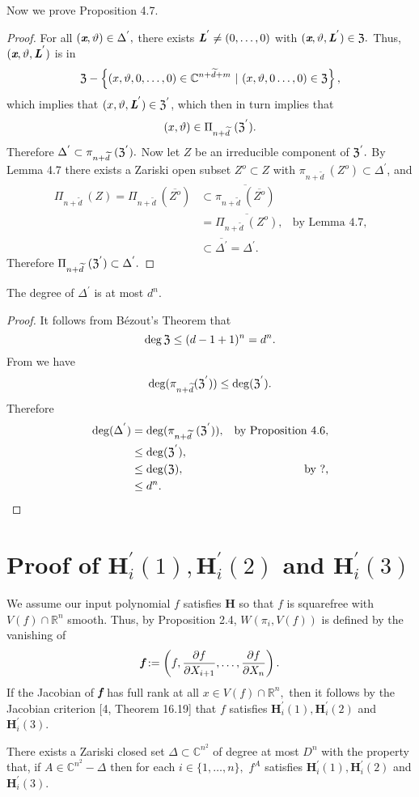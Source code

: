 \documentclass[sigconf]{acmart}
\def\fb{\textit{\textbf{f}}}
\def\C{\mathbb{C}}
\def\vt{\vartheta}
\def\dt{\widetilde{d}}
\def\pa{\partial}
\def\D{\Delta}
\def\Z{\frak{Z}}
\begin{document}
%
%
Now we prove Proposition 4.7.
\begin{proof}
For all $(\textit{\textbf{x}},\vt) \in \D^{'}, $ there exists $\textit{\textbf{L}}^{'} \not = (0,\hdots,0)$ with $(\textit{\textbf{x}},\vt,\textit{\textbf{L}}^{'}) \in \Z.$ Thus, $(\textit{\textbf{x}},\vt,\textit{\textbf{L}}^{'})$ is in
\[
     \Z - \left\{(x,\vt,0,\hdots,0) \in \C^{n+\dt+m}~|~(x,\vt,0\hdots,0) \in \Z\right\}, 
\]
which implies that $(x,\vt,\textit{\textbf{L}}^{'}) \in \Z^{'}$, which then in turn implies that
\[
    (x,\vt) \in \Pi_{n + \dt}~(\Z^{'}).
\]
Therefore $\D^{'} \subset \pi_{n+\dt}~(\Z^{'}).$
\newline \indent 
Now let $Z$ be an irreducible component of $\Z^{'}.$ By Lemma 4.7 there exists a Zariski open subset $Z^o \subset Z$ with $\pi_{n+\dt}~(Z^{o}) \subset \D^{'}$, and
\begin{align*}
 \Pi_{n+\dt}~(Z) = 
  \Pi_{n+\dt}~(\overline{Z^o})
  &\subset 
  \overline{\pi_{n+\dt}~(\overline{Z^o})}\\
  &=
  \overline{\Pi_{n+\dt}~(Z^o)}, &\textrm{by Lemma 4.7,}\\
  &\subset \overline{\D^{'}}=\D^{'}.
\end{align*}
   Therefore $\Pi_{n+\dt}~(\Z^{'}) \subset \D^{'}.$
\end{proof}
%
%
\begin{proposition} 
The degree of $\D^{'}$ is at most $d^n.$
\end{proposition} 
\begin{proof}
It follows from B\'ezout's Theorem that 
\[
\deg \frak{Z} \leq (d-1+1)^n=d^n.
\]
From \cite[Lemma 2]{H} we have 
\[
\deg(\pi_{n+\dt}(\Z^{'})) \leq \deg(\Z^{'}).
\]
Therefore 
\begin{align*}
\deg(\D^{'}) &= \deg(\pi_{n+\dt}~(\Z^{'})),&\textrm{by Proposition 4.6,}\\ 
            &\leq \deg(\Z^{'}),\\ 
            &\leq \deg(\Z), &\textrm{by ?,}\\ 
            &\leq d^n.
\end{align*}
\end{proof}
%
%
%
\section{Proof of $\textbf{H}_i^{'}(1),\textbf{H}_i^{'}(2)$ and $\textbf{H}_i^{'}(3)$}
%
%
We assume our input polynomial $f$ satisfies \textbf{H} so that $f$ is squarefree with $V(f) \cap \mathbb{R}^n$ smooth. Thus, by Proposition 2.4,  $W(\pi_i,V(f))$ is defined by the vanishing of \[\fb := \left(f,\frac{\pa f}{\pa X_{i+1}},\hdots,\frac{\pa f}{\pa X_n}\right).\]
If the Jacobian of $\fb$ has full rank at all $x \in V(f) \cap \mathbb{R}^n,$ then it follows by the Jacobian criterion [4, Theorem 16.19] that $f$ satisfies $\textbf{H}_i^{'}(1),\textbf{H}_i^{'}(2)$ and $\textbf{H}_i^{'}(3)$. 
%
\begin{theorem}
There exists a Zariski closed set $\Delta \subset \C^{n^2}$ of degree at most $D^n$ with the property that, if $A \in \C^{n^2} - \Delta$ then for each $i \in \{1,\hdots,n\},$ $f^A$ satisfies $\textbf{H}_i^{'}(1),\textbf{H}_i^{'}(2)$ and $\textbf{H}_i^{'}(3)$.
\end{theorem}
\end{document}
